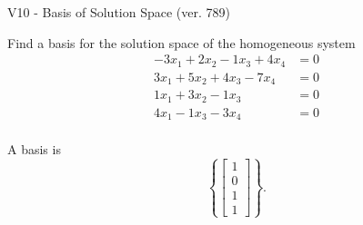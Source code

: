 \begin{exercise}
  \begin{exerciseTitle}V10 - Basis of Solution Space (ver. 789)\end{exerciseTitle}
  \begin{exerciseStatement}
    Find a basis for the solution space of the homogeneous system 
\begin{align*}
 -3 x_ 1 + 2 x_ 2 -1 x_ 3 + 4 x_ 4 &= 0  \\ 
  3 x_ 1 + 5 x_ 2 + 4 x_ 3 -7 x_ 4 &= 0  \\ 
  1 x_ 1 + 3 x_ 2 -1 x_ 3 &= 0  \\ 
  4 x_ 1 -1 x_ 3 -3 x_ 4 &= 0  \\ 
 \end{align*}


 
  \end{exerciseStatement}

  \begin{exerciseAnswer}
   A basis is   
\[\left\{\left[\begin{array}{c}
1 \\
0 \\
1 \\
1
\end{array}\right]\right\}.\]

  


  \end{exerciseAnswer}
\end{exercise}